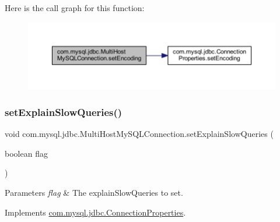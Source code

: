 Here is the call graph for this function\+:
\nopagebreak
\begin{figure}[H]
\begin{center}
\leavevmode
\includegraphics[width=350pt]{classcom_1_1mysql_1_1jdbc_1_1_multi_host_my_s_q_l_connection_ac1a500dcfbd93a1256da1104c58cfc7f_cgraph}
\end{center}
\end{figure}
\mbox{\label{classcom_1_1mysql_1_1jdbc_1_1_multi_host_my_s_q_l_connection_aae6e6a98dc0bdfbf91fd7e5eecb0e1ca}} 
\subsubsection{\texorpdfstring{set\+Explain\+Slow\+Queries()}{setExplainSlowQueries()}}
{\footnotesize\ttfamily void com.\+mysql.\+jdbc.\+Multi\+Host\+My\+S\+Q\+L\+Connection.\+set\+Explain\+Slow\+Queries (\begin{DoxyParamCaption}\item[{boolean}]{flag }\end{DoxyParamCaption})}


\begin{DoxyParams}{Parameters}
{\em flag} & The explain\+Slow\+Queries to set. \\
\hline
\end{DoxyParams}


Implements \mbox{\hyperlink{interfacecom_1_1mysql_1_1jdbc_1_1_connection_properties_a9857fb61eea34e28c3bbff76b6ac5ca9}{com.\+mysql.\+jdbc.\+Connection\+Properties}}.

